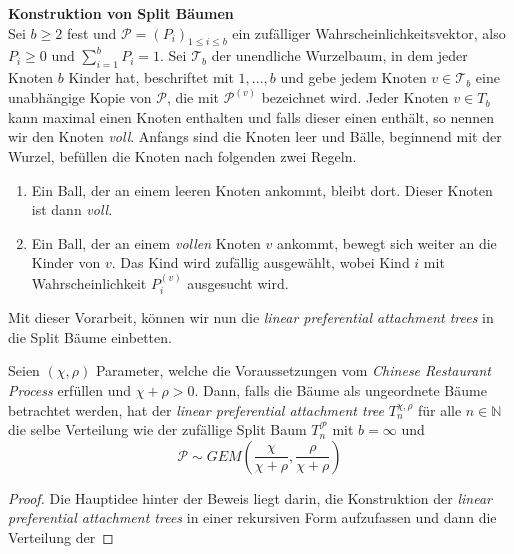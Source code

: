 \textbf{\fontsize{14}{18}\selectfont Konstruktion von Split Bäumen}\\
Sei $b \geq 2$ fest und $\mathcal{P} = (P_i)_{1 \leq i \leq b}$ ein zufälliger Wahrscheinlichkeitsvektor, also $P_i \geq 0$ und $\sum_{i=1}^{b}P_i = 1$. Sei $\mathcal{T}_b$ der unendliche Wurzelbaum, in dem jeder Knoten $b$ Kinder hat, beschriftet mit $1,...,b$ und gebe jedem Knoten $v \in \mathcal{T}_b$ eine unabhängige Kopie von $\mathcal{P}$, die mit $\mathcal{P}^{(v)}$ bezeichnet wird. Jeder Knoten $v \in T_b$ kann maximal einen Knoten enthalten und falls dieser einen enthält, so nennen wir den Knoten \textit{voll}. Anfangs sind die Knoten leer und Bälle, beginnend mit der Wurzel, befüllen die Knoten nach folgenden zwei Regeln.
\begin{enumerate}
    \item Ein Ball, der an einem leeren Knoten ankommt, bleibt dort. Dieser Knoten ist dann \textit{voll}.
    \item Ein Ball, der an einem \textit{vollen} Knoten $v$ ankommt, bewegt sich weiter an die Kinder von $v$. Das Kind wird zufällig ausgewählt, wobei Kind $i$ mit Wahrscheinlichkeit $P_i^{(v)}$ ausgesucht wird.
\end{enumerate}





Mit dieser Vorarbeit, können wir nun die \textit{linear preferential attachment trees} in die Split Bäume einbetten.
\begin{theorem}
    Seien $(\chi,\rho)$ Parameter, welche die Voraussetzungen vom \textit{Chinese Restaurant Process} erfüllen und $\chi + \rho > 0$. Dann, falls die Bäume als ungeordnete Bäume betrachtet werden, hat der \textit{linear preferential attachment tree} $T_n^{\chi,\rho}$ für alle $n \in \mathbb{N}$ die selbe Verteilung wie der zufällige Split Baum $T^\mathcal{P}_n$ mit $b = \infty$ und 
    \[ 
    \mathcal{P} \sim GEM(\frac{\chi}{\chi + \rho}, \frac{\rho}{\chi + \rho})
    \] 
\begin{proof}
    Die Hauptidee hinter der Beweis liegt darin, die Konstruktion der \textit{linear preferential attachment trees} in einer rekursiven Form aufzufassen und dann die Verteilung der 
\end{proof}
\end{theorem}


